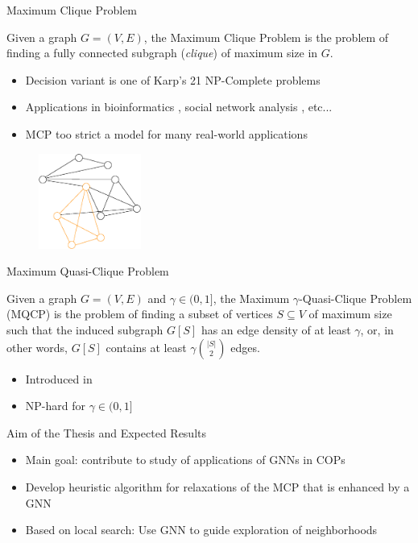\documentclass{beamer}
\begin{document}
\begin{frame}{Maximum Clique Problem}
    \begin{definition}
        Given a graph $G= (V,E)$, the Maximum Clique Problem is the problem of finding a fully connected subgraph (\textit{clique}) of maximum size in $G$.
    \end{definition}
    \begin{itemize}
        \item Decision variant is one of Karp's 21 NP-Complete problems \cite{Karp1972}
        \item Applications in bioinformatics \cite{Dognin2010}, social network analysis \cite{Pattillo_network_analysis_2013}, etc...
        \item MCP too strict a model for many real-world applications
    \end{itemize}
    \begin{figure}
        \centering
        \includegraphics[width=0.3\textwidth]{graphics/graph1-clique.eps}
    \end{figure}
\end{frame}

\begin{frame}{Maximum Quasi-Clique Problem}
    \begin{definition}
	\label{def:mqcp}
	Given a graph $G = (V,E)$ and $\gamma \in (0,1]$, the Maximum $\gamma$-Quasi-Clique Problem (MQCP) is the problem of finding a subset of vertices $S \subseteq V$ of maximum size 
	such that the induced subgraph $G[S]$ has an edge density of at least $\gamma$, or, in other words, $G[S]$ contains at least $\gamma \binom{|S|}{2}$ edges. 
    \end{definition}
    \begin{itemize}
        \item Introduced in \cite{Abello2002}
        \item NP-hard for $\gamma \in (0,1]$ \cite{pattillo_maximum_2013}
    \end{itemize}
\end{frame}

\begin{frame}{Aim of the Thesis and Expected Results}
    \begin{itemize}
        \item<1-> Main goal: contribute to study of applications of GNNs in COPs
        \item<2-> Develop heuristic algorithm for relaxations of the MCP that is enhanced by a GNN
        \item<3-> Based on local search: Use GNN to guide exploration of neighborhoods
    \end{itemize}
\end{frame}
\end{document}
